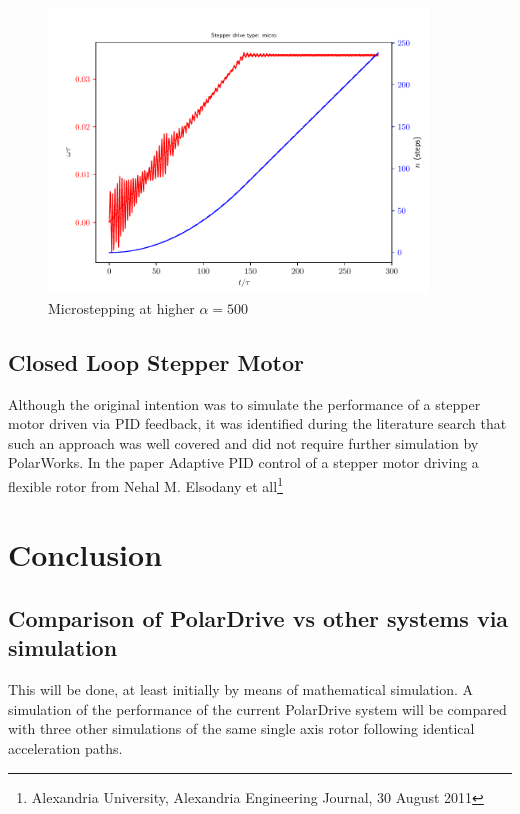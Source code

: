 \documentclass{article}
\begin{document}
\begin{figure}[h!]
  \centering
  \includegraphics[width=0.9\textwidth]{simfigs/fig1-2018-10-20T14-34-21-micro8-alpha-500.pdf}
  \captionsetup{justification=centering}
  \caption{Microstepping at higher $\alpha = 500$}
   \label{fig:micro8-alpha-500}
\end{figure}
\subsection{Closed Loop Stepper Motor}
Although the original intention was to simulate the performance of a stepper motor driven via PID feedback, it was identified during the literature search that such an approach was well covered and did not require further simulation by PolarWorks. In the paper Adaptive PID control of a stepper motor driving a flexible rotor from Nehal M. Elsodany et all\footnote{Alexandria University,
Alexandria Engineering Journal, 30 August 2011} 

\section{Conclusion}
\subsection{Comparison of PolarDrive vs other systems via simulation}
This will be done, at least initially by means of mathematical simulation. A simulation of the performance of the current PolarDrive system will be compared with three other simulations of the same single axis rotor following identical acceleration paths.
\end{document}
